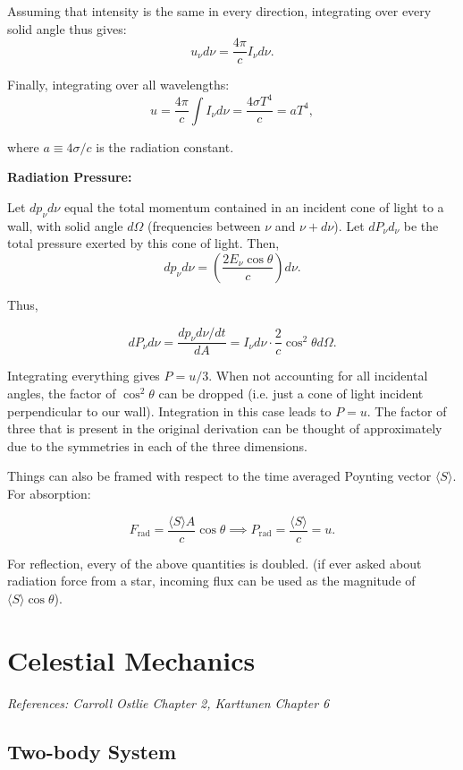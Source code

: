 \documentclass[12pt]{article}
\newcommand{\V}{

\vspace{\baselineskip}

}
\begin{document}
Assuming that intensity is the same in every direction, integrating over every solid angle thus gives: 
\[u_{\nu}d\nu = \frac{4\pi}{c}I_{\nu}d\nu.\]

Finally, integrating over all wavelengths: 
\[u = \frac{4\pi}{c}\int I_{\nu}d\nu = \frac{4\sigma T^4}{c} = aT^4,\]

where $a \equiv 4\sigma/c$ is the radiation constant.\V

\textbf{Radiation Pressure:}

Let $dp_{\nu}d\nu$ equal the total momentum contained in an incident cone of light to a wall, with solid angle $d\Omega$ (frequencies between $\nu$ and $\nu + d\nu$). Let $dP_{\nu}d_{\nu}$ be the total pressure exerted by this cone of light. Then, 
\[dp_{\nu}d\nu = \left(\frac{2E_{\nu}\cos{\theta}}{c}\right)d\nu.\]

Thus, 

\[dP_{\nu}d\nu = \frac{dp_{\nu}d\nu/dt}{dA} = I_{\nu}d\nu\cdot \frac{2}{c}\cos^2{\theta}d\Omega.\]

Integrating everything gives $P = u/3$. When not accounting for all incidental angles, the factor of $\cos^2{\theta}$ can be dropped (i.e. just a cone of light incident perpendicular to our wall). Integration in this case leads to $P = u$. The factor of three that is present in the original derivation can be thought of approximately due to the symmetries in each of the three dimensions.

Things can also be framed with respect to the time averaged Poynting vector $\langle S\rangle$. For absorption:

\[F_{\text{rad}} = \frac{\langle S\rangle A}{c}\cos{\theta} \implies P_{\text{rad}} = \frac{\langle S\rangle}{c} = u.\]

For reflection, every of the above quantities is doubled. (if ever asked about radiation force from a star, incoming flux can be used as the magnitude of $\langle S\rangle\cos{\theta}$).

\newpage
\section{Celestial Mechanics}

\textit{References: Carroll Ostlie Chapter 2, Karttunen Chapter 6}

\subsection{Two-body System}
\end{document}
